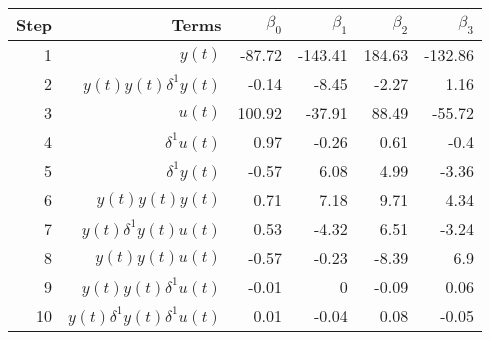 \begin{tabular}{rrrrrr}
Step & Terms & $\beta_{0}$ & $\beta_{1}$ & $\beta_{2}$ & $\beta_{3}$ \\ 
\hline 
1 & $y(t)$ & -87.72 & -143.41 & 184.63 & -132.86 \\ 
2 & $y(t)y(t)\delta^1 y(t)$ & -0.14 & -8.45 & -2.27 & 1.16 \\ 
3 & $u(t)$ & 100.92 & -37.91 & 88.49 & -55.72 \\ 
4 & $\delta^1 u(t)$ & 0.97 & -0.26 & 0.61 & -0.4 \\ 
5 & $\delta^1 y(t)$ & -0.57 & 6.08 & 4.99 & -3.36 \\ 
6 & $y(t)y(t)y(t)$ & 0.71 & 7.18 & 9.71 & 4.34 \\ 
7 & $y(t)\delta^1 y(t)u(t)$ & 0.53 & -4.32 & 6.51 & -3.24 \\ 
8 & $y(t)y(t)u(t)$ & -0.57 & -0.23 & -8.39 & 6.9 \\ 
9 & $y(t)y(t)\delta^1 u(t)$ & -0.01 & 0 & -0.09 & 0.06 \\ 
10 & $y(t)\delta^1 y(t)\delta^1 u(t)$ & 0.01 & -0.04 & 0.08 & -0.05 \\ 
\hline 
\end{tabular}